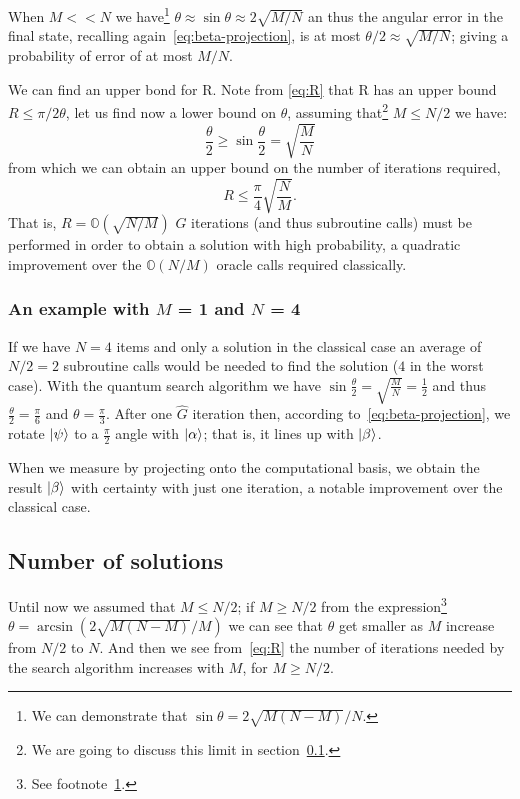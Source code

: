 When $M<<N$ we have\footnote{\label{foot:sin}We can demonstrate that $\sin\theta = 2\sqrt{M(N-M)}/N$.} $\theta \approx \sin\theta \approx 2\sqrt{M/N}$ an thus the angular error in the final state, recalling again~\ref{eq:beta-projection}, is at most $\theta/2 \approx \sqrt{M/N}$; giving a probability of error of at most $M/N$.

We can find an upper bond for R. Note from \ref{eq:R}  that R has an upper bound $R \leq \pi/2\theta$, let us find now a lower bound on $\theta$, assuming that\footnote{We are going to discuss this limit in section~\ref{sec:M}.} $M \leq N/2$ we have:
\begin{equation*}
    \frac{\theta}{2} \geq \sin\frac{\theta}{2} = \sqrt{\frac{M}{N}}
\end{equation*}
from which we can obtain an upper bound on the number of iterations required,
\begin{equation}\label{eq:upper-bound}
    R \leq \frac{\pi}{4} \sqrt{\frac{N}{M}}.
\end{equation}
That is, $R = \mathbb{O}(\sqrt{N/M})$ $G$ iterations (and thus subroutine calls) must be performed in order to obtain a solution with high probability, a quadratic improvement over the $\mathbb{O}(N/M)$ oracle calls required classically.

\subsubsection{An example with $M$ = 1 and $N$ = 4}
If we have $N = 4$ items and only a solution in the classical case an average of $N/2 = 2$ subroutine calls would be needed to find the solution ($4$ in the worst case).
With the quantum search algorithm we have $\sin{\frac{\theta}{2}} = \sqrt{\frac{M}{N}} = \frac{1}{2}$ and thus $\frac{\theta}{2} = \frac{\pi}{6}$ and $\theta = \frac{\pi}{3}$. After one $\hat{G}$ iteration then, according to~\ref{eq:beta-projection}, we rotate $\ket{\psi}$ to a $\frac{\pi}{2}$ angle with $\ket{\alpha}$; that is, it lines up with $\ket{\beta}$.

When we measure by projecting onto the computational basis, we obtain the result $\ket{\beta}$ with certainty with just one iteration, a notable improvement over the classical case.

\subsection{Number of solutions}\label{sec:M}
Until now we assumed that $M\leq N/2$; if $M \geq N/2$ from the expression\footnote{See footnote~\ref{foot:sin}.} $\theta=\arcsin(2\sqrt{M(N-M)}/M)$ we can see that $\theta$ get smaller as $M$ increase from $N/2$ to $N$. And then we see from~\ref{eq:R} the number of iterations needed by the search algorithm increases with $M$, for $M\geq N/2$.

